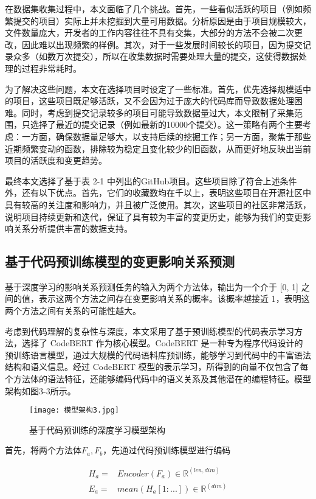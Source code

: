 在数据集收集过程中，本文面临了几个挑战。首先，一些看似活跃的项目（例如频繁提交的项目）实际上并未挖掘到大量可用数据。分析原因是由于项目规模较大，文件数量庞大，开发者的工作内容往往不具有交集，大部分的方法不会被二次更改，因此难以出现频繁的样例。其次，对于一些发展时间较长的项目，因为提交记录众多（如数万次提交），所以在收集数据时需要处理大量的提交，这使得数据处理的过程非常耗时。

为了解决这些问题，本文在选择项目时设定了一些标准。首先，优先选择规模适中的项目，这些项目既足够活跃，又不会因为过于庞大的代码库而导致数据处理困难。同时，考虑到提交记录较多的项目可能导致数据量过大，本文限制了采集范围，只选择了最近的提交记录（例如最新的10000个提交）。这一策略有两个主要考虑：一方面，确保数据量足够大，以支持后续的挖掘工作；另一方面，聚焦于那些近期频繁变动的函数，排除较为稳定且变化较少的旧函数，从而更好地反映出当前项目的活跃度和变更趋势。

最终本文选择了基于表 2-1 中列出的GitHub项目。这些项目除了符合上述条件外，还有以下优点。首先，它们的收藏数均在千以上，表明这些项目在开源社区中具有较高的关注度和影响力，并且被广泛使用。其次，这些项目的社区非常活跃，说明项目持续更新和迭代，保证了具有较为丰富的变更历史，能够为我们的变更影响关系分析提供丰富的数据支持。

\subsection{基于代码预训练模型的变更影响关系预测}

基于深度学习的影响关系预测任务的输入为两个方法体，输出为一个介于 [0, 1] 之间的值，表示这两个方法之间存在变更影响关系的概率。该概率越接近 1，表明这两个方法之间有关系的可能性越大。

考虑到代码理解的复杂性与深度，本文采用了基于预训练模型的代码表示学习方法，选择了 CodeBERT 作为核心模型。CodeBERT 是一种专为程序代码设计的预训练语言模型，通过大规模的代码语料库预训练，能够学习到代码中的丰富语法结构和语义信息。经过 CodeBERT 模型的表示学习，所得到的向量不仅包含了每个方法体的语法特征，还能够编码代码中的语义关系及其他潜在的编程特征。模型架构如图3-3所示。

\begin{figure}[h]
\centering
\texttt{[image: 模型架构3.jpg]}
\caption{基于代码预训练的深度学习模型架构}
\end{figure}


首先，将两个方法体$ F_a, F_b$，先通过代码预训练模型进行编码

\begin{align}
H_a=&Encoder(F_a) \in \mathbb{R}^{(len,dim)} \\
E_a=&mean(H_a[1:...]) \in \mathbb{R}^{(dim)}
\end{align}


